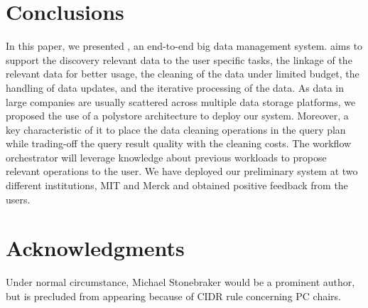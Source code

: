 \section{Conclusions}
\label{sec:conclusion}

In this paper, we presented \dcv,  an end-to-end big data management system. \dcv aims to support 
the discovery relevant data to the user specific tasks, 
the linkage of the relevant data for better usage, 
the cleaning of the data under limited budget, 
the handling of  data updates, 
and the iterative processing of the data. 
As data in large companies are usually scattered across multiple
data storage platforms, we proposed the use of a polystore architecture to deploy our system.
Moreover, a key characteristic of \dcv it to place the data cleaning operations in the query plan
while  trading-off the query result quality with the cleaning costs. 
The \dcv workflow orchestrator will leverage knowledge about previous workloads to propose relevant operations to the user.
We have deployed our preliminary system at two different institutions, MIT and Merck and obtained positive
feedback from the users.

\section{Acknowledgments}

Under normal circumstance, Michael Stonebraker would be a prominent author, but is precluded from appearing because of CIDR rule concerning PC chairs.


